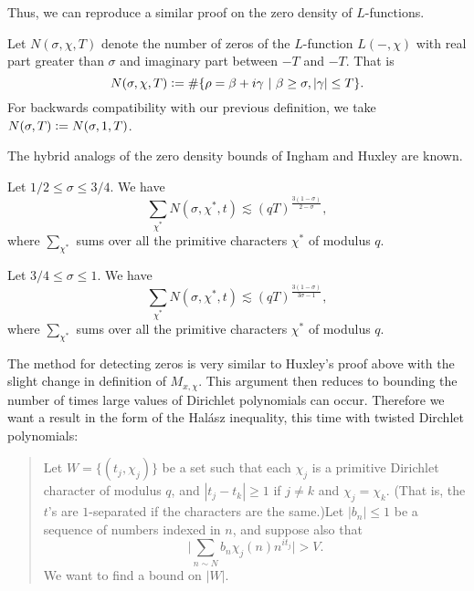 Thus, we can reproduce a similar proof on the zero density of $L$-functions. 
\begin{definition}
    Let $N(\sigma,\chi,T)$ denote the number of zeros of the $L$-function $L(-,\chi)$ with real part greater than $\sigma$ and imaginary part between $-T$ and $-T$. That is \[
    N(\sigma,\chi,T) \mathrel{\mathop:}= \#\{\rho=\beta+i\gamma \ | \ \beta\geq \sigma, |\gamma|\leq T\}.
    \]
    For backwards compatibility with our previous definition, we take $N(\sigma,T)\mathrel{\mathop:}= N(\sigma, 1,T)$.
\end{definition}
The hybrid analogs of the zero density bounds of Ingham and Huxley are known.
\begin{theorem}
    Let $1/2\leq \sigma\leq 3/4$. We have \[
        \sum_{\chi^* }N(\sigma,\chi^*,t)\lesssim (qT)^{\frac{3(1-\sigma)}{2-\sigma}},
        \]
        where $\sum_{\chi^*}$ sums over all the primitive characters $\chi^*$ of modulus $q$.
\end{theorem}
\begin{theorem}
    Let $3/4\leq \sigma\leq 1$. We have \[
        \sum_{\chi^* }N(\sigma,\chi^*,t)\lesssim (qT)^{\frac{3(1-\sigma)}{3\sigma-1}},
        \]        
        where $\sum_{\chi^*}$ sums over all the primitive characters $\chi^*$ of modulus $q$.
\end{theorem}

The method for detecting zeros is very similar to Huxley's proof above with the slight change in definition of $M_{x,\chi}$. This argument then reduces to bounding the number of times large values of Dirichlet polynomials can occur. Therefore we want a result in the form of the Hal\'asz inequality, this time with twisted Dirchlet polynomials:
\begin{quotation}  
Let $W=\{(t_j,\chi_j)\}$ be a set such that each $\chi_j$ is a primitive Dirichlet character of modulus $q$, and $|t_j-t_k|\geq 1$ if $j\neq k$ and $\chi_j=\chi_k$. (That is, the $t$'s are $1$-separated if the characters are the same.)Let $|b_n|\leq 1$ be a sequence of numbers indexed in $n$, and suppose also that \[
\Bigg|\sum_{n\sim N} b_n\chi_j(n)n^{it_j} \Bigg|>V.
\]
We want to find a bound on $|W|$.
\end{quotation}
